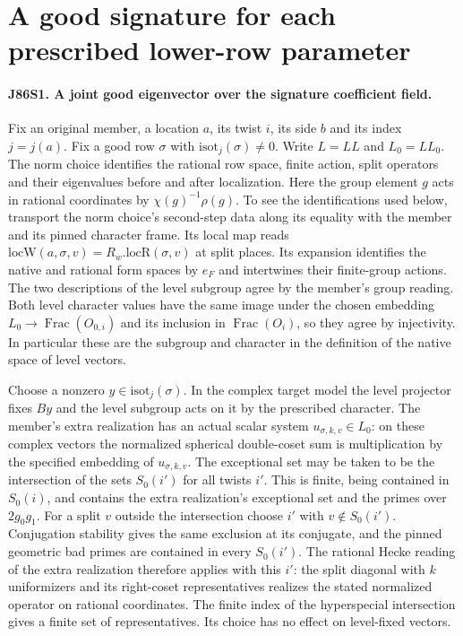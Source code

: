 \section{A good signature for each prescribed lower-row parameter}

\paragraph{J86S1. A joint good eigenvector over the signature coefficient field.}
Fix an original member, a location $a$, its twist $i$, its side $b$
and its index $j=j(a)$. Fix a good row $\sigma$ with
$\mathrm{isot}_j(\sigma)\ne0$. Write $L=LL$ and $L_0=LL_0$.
The norm choice identifies the rational row space, finite action,
split operators and their eigenvalues before and after localization.
Here the group element $g$ acts in rational coordinates by
$\chi(g)^{-1}\rho(g)$. To see the identifications used below,
transport the norm choice's second-step data along its equality
with the member and its pinned character frame. Its local map reads
$\mathrm{locW}(a,\sigma,v)=R_w.\mathrm{locR}(\sigma,v)$ at split
places. Its expansion identifies the native and rational form spaces
by $e_F$ and intertwines their finite-group actions. The two
descriptions of the level subgroup agree by the member's group
reading. Both level character values have the same image under the
chosen embedding $L_0\to\operatorname{Frac}(O_{0,i})$ and its
inclusion in $\operatorname{Frac}(O_i)$, so they agree by
injectivity. In particular these are the subgroup and character in
the definition of the native space of level vectors.

Choose a nonzero $y\in\mathrm{isot}_j(\sigma)$. In the complex
target model the level projector fixes $By$ and the level subgroup
acts on it by the prescribed character. The member's extra
realization has an actual scalar system $u_{\sigma,k,v}\in L_0$:
on these complex vectors the normalized spherical double-coset sum
is multiplication by the specified embedding of $u_{\sigma,k,v}$.
The exceptional set may be taken to be the intersection of the
sets $S_0(i')$ for all twists $i'$. This is finite, being contained
in $S_0(i)$, and contains the extra realization's exceptional set
and the primes over $2g_0g_1$. For a split $v$ outside the
intersection choose $i'$ with $v\notin S_0(i')$. Conjugation
stability gives the same exclusion at its conjugate, and the pinned
geometric bad primes are contained in every $S_0(i')$. The rational
Hecke reading of the extra realization therefore applies with this
$i'$: the split diagonal with $k$ uniformizers and its right-coset
representatives realizes the stated normalized operator on rational
coordinates. The finite index of the hyperspecial intersection gives
a finite set of representatives. Its choice has no effect on
level-fixed vectors.

